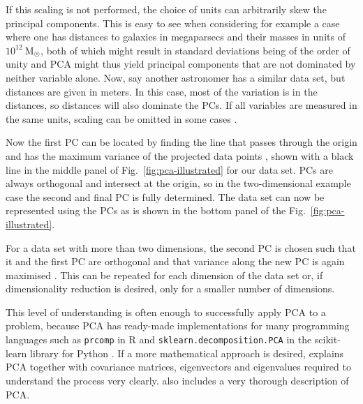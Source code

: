 \documentclass[english, oneside]{HYgradu}
\begin{document}
If this scaling is not performed, the choice of units can arbitrarily skew the principal components. This is easy to see when considering for example a case where one has distances to galaxies in megaparsecs and their masses in units of $10^{12}\ \mathrm{M_{\astrosun}}$, both of which might result in standard deviations being of the order of unity and PCA might thus yield principal components that are not dominated by neither variable alone. Now, say another astronomer has a similar data set, but distances are given in meters. In this case, most of the variation is in the distances, so distances will also dominate the PCs. If all variables are measured in the same units, scaling can be omitted in some cases \citep{james2013introduction}.

Now the first PC can be located by finding the line that passes through the origin and has the maximum variance of the projected data points \citep{jolliffe2002principal}, shown with a black line in the middle panel of Fig.\ \ref{fig:pca-illustrated} for our data set. PCs are always orthogonal and intersect at the origin, so in the two-dimensional example case the second and final PC is fully determined. The data set can now be represented using the PCs as is shown in the bottom panel of the Fig.\ \ref{fig:pca-illustrated}.

For a data set with more than two dimensions, the second PC is chosen such that it and the first PC are orthogonal and that variance along the new PC is again maximised \citep{jolliffe2002principal}. This can be repeated for each dimension of the data set or, if dimensionality reduction is desired, only for a smaller number of dimensions.

This level of understanding is often enough to successfully apply PCA to a problem, because PCA has ready-made implementations for many programming languages such as \texttt{prcomp} in R \citep{james2013introduction} and \texttt{sklearn.decomposition.PCA} in the scikit-learn library  for Python \citep{scikit-learn}. If a more mathematical approach is desired, \citet{smith2002tutorial} explains PCA together with covariance matrices, eigenvectors and eigenvalues required to understand the process very clearly. \citet{jolliffe2002principal} also includes a very thorough description of PCA.
\end{document}
